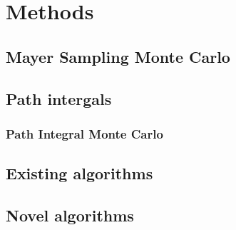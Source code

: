 \chapter{Methods}
\section{Mayer Sampling Monte Carlo}
\section{Path intergals}
\subsection{Path Integral Monte Carlo}
\section{Existing algorithms}
\section{Novel algorithms}
